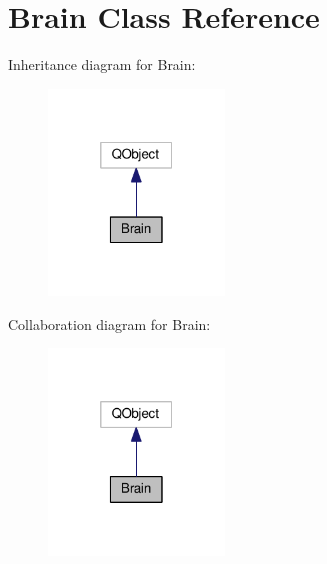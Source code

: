 \hypertarget{classBrain}{}\section{Brain Class Reference}
\label{classBrain}


Inheritance diagram for Brain\+:
\nopagebreak
\begin{figure}[H]
\begin{center}
\leavevmode
\includegraphics[width=133pt]{classBrain__inherit__graph}
\end{center}
\end{figure}


Collaboration diagram for Brain\+:
\nopagebreak
\begin{figure}[H]
\begin{center}
\leavevmode
\includegraphics[width=133pt]{classBrain__coll__graph}
\end{center}
\end{figure}
